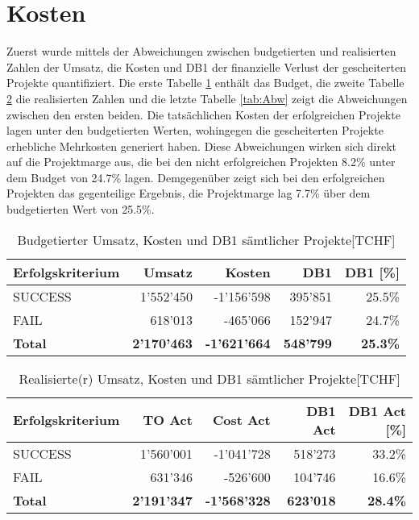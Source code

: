 \section{Kosten}
Zuerst wurde mittels der Abweichungen zwischen budgetierten und realisierten Zahlen der Umsatz, die Kosten und DB1 der finanzielle Verlust der gescheiterten Projekte quantifiziert. Die erste Tabelle \ref{tab:bud} enthält das Budget, die zweite Tabelle \ref{tab:act} die realisierten Zahlen und die letzte Tabelle \ref{tab:Abw} zeigt die Abweichungen zwischen den ersten beiden. Die tatsächlichen Kosten der erfolgreichen Projekte lagen unter den budgetierten Werten, wohingegen die gescheiterten Projekte erhebliche Mehrkosten generiert haben. Diese Abweichungen wirken sich direkt auf die Projektmarge aus, die bei den nicht erfolgreichen Projekten 8.2\% unter dem Budget von 24.7\% lagen. Demgegenüber zeigt sich bei den erfolgreichen Projekten das gegenteilige Ergebnis, die Projektmarge lag 7.7\% über dem budgetierten Wert von 25.5\%.
\newline 
\begin{table}[H]
	\centering
	\caption{Budgetierter Umsatz, Kosten und DB1 sämtlicher Projekte[TCHF]}
	\begin{tabular}{lrrrr}
		\toprule
		\textbf{Erfolgskriterium} & \textbf{Umsatz} & \textbf{Kosten} &
		\textbf{DB1} & \textbf{DB1 [\%]} \\
		\midrule
		SUCCESS & 1'552'450 & -1'156'598 & 395'851 & 25.5\% \\
		FAIL  & 618'013 & -465'066 & 152'947 & 24.7\% \\
		\bottomrule
		\textbf{Total} & \textbf{2'170'463} & \textbf{-1'621'664} & \textbf{548'799} & \textbf{25.3\%}\\
	\end{tabular}%
	\label{tab:bud}%
\end{table}%
\begin{table}[H]
	\centering
	\caption{Realisierte(r) Umsatz, Kosten und DB1 sämtlicher Projekte[TCHF]}
	\begin{tabular}{lrrrr}
		\toprule
		\textbf{Erfolgskriterium} & \textbf{TO Act} & \textbf{Cost Act} & \textbf{DB1 Act}&
		\textbf{DB1 Act [\%]} \\
		\midrule
		SUCCESS & 1'560'001 & -1'041'728 & 518'273 & 33.2\% \\
		FAIL  & 631'346 & -526'600 & 104'746 & 16.6\% \\
		\bottomrule
		\textbf{Total} & \textbf{2'191'347} & \textbf{-1'568'328} & \textbf{623'018} & \textbf{28.4\%} \\
	\end{tabular}
	\label{tab:act}%
\end{table}%
